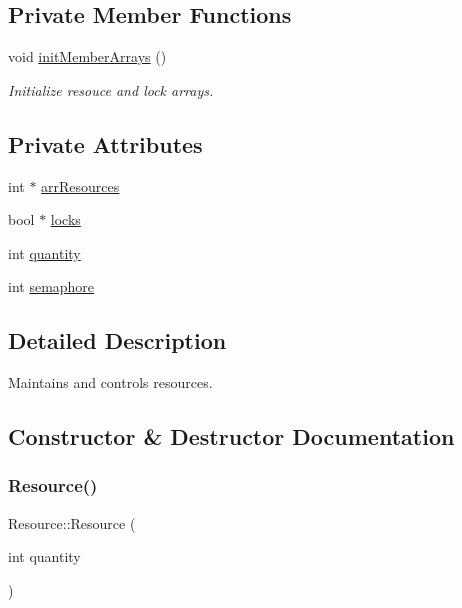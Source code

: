 \subsection*{Private Member Functions}
\begin{DoxyCompactItemize}
\item 
void \hyperlink{class_resource_a7af655f2da504607f1d35708dc479987}{init\+Member\+Arrays} ()
\begin{DoxyCompactList}\small\item\em Initialize resouce and lock arrays. \end{DoxyCompactList}\end{DoxyCompactItemize}
\subsection*{Private Attributes}
\begin{DoxyCompactItemize}
\item 
int $\ast$ \hyperlink{class_resource_a79fa88cc3a0abd81a39d5bcb159ccda3}{arr\+Resources}
\item 
bool $\ast$ \hyperlink{class_resource_a65c93bcbd07aa8e6d9b49176725e8b26}{locks}
\item 
int \hyperlink{class_resource_ad87427f8c53da8c83f4a00a2eef25f7f}{quantity}
\item 
int \hyperlink{class_resource_a108a01aac9b07a994e57cd50f283b4fa}{semaphore}
\end{DoxyCompactItemize}


\subsection{Detailed Description}
Maintains and controls resources. 

\subsection{Constructor \& Destructor Documentation}
\hypertarget{class_resource_aa66a88a5d14d251bead3660f7bcf1e37}{}\label{class_resource_aa66a88a5d14d251bead3660f7bcf1e37} 
\subsubsection{\texorpdfstring{Resource()}{Resource()}}
{\footnotesize\ttfamily Resource\+::\+Resource (\begin{DoxyParamCaption}\item[{int}]{quantity }\end{DoxyParamCaption})}



